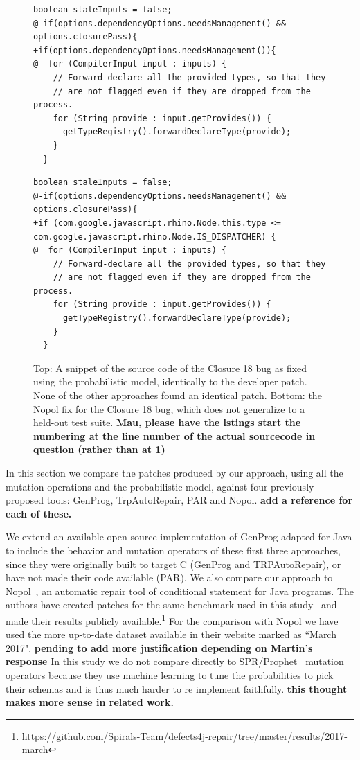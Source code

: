 \documentclass[conference]{IEEEtran}
\newcommand{\todo}[1]
  {{\scriptsize \textbf{\color{red} {#1}}}}
\begin{document}
\begin{figure}[t]
\begin{lstlisting}[frame=single]
boolean staleInputs = false;
@-if(options.dependencyOptions.needsManagement() && options.closurePass){
+if(options.dependencyOptions.needsManagement()){
@  for (CompilerInput input : inputs) {
    // Forward-declare all the provided types, so that they
    // are not flagged even if they are dropped from the process.
    for (String provide : input.getProvides()) {
      getTypeRegistry().forwardDeclareType(provide);
    }  
  }
	\end{lstlisting}


\begin{lstlisting}[frame=single]
boolean staleInputs = false;
@-if(options.dependencyOptions.needsManagement() && options.closurePass){
+if (com.google.javascript.rhino.Node.this.type <= com.google.javascript.rhino.Node.IS_DISPATCHER) {
@  for (CompilerInput input : inputs) {
    // Forward-declare all the provided types, so that they
    // are not flagged even if they are dropped from the process.
    for (String provide : input.getProvides()) {
      getTypeRegistry().forwardDeclareType(provide);
    }  
  }
	\end{lstlisting}

	\caption{Top: A snippet of the source code of the Closure 18 bug as fixed using the
      probabilistic model, identically to the developer patch. None of the other
      approaches found an identical patch.  Bottom: the Nopol fix for the
      Closure 18 bug, which does not generalize to a held-out test
      suite.\label{closure18prob}\todo{Mau, please have the lstings start the
        numbering at the line number of the actual sourcecode in question
        (rather than at 1)}}
\end{figure}

In this section we compare the patches produced by our approach, using all the
mutation operations and the probabilistic model, against
four previously-proposed tools:  GenProg, TrpAutoRepair, PAR and Nopol.\todo{add
  a reference for each of these.}

We extend an available open-source implementation of GenProg adapted for Java to
include the behavior and mutation operators of these first three approaches,
since they were originally built to target C (GenProg and TRPAutoRepair), or
have not made their code available (PAR). We also compare our approach to
Nopol~\cite{xuanNopol}, an automatic repair tool of conditional statement for
Java programs. The authors have created patches for the same benchmark used in
this study~\cite{martinez2016} and made their results publicly
available.\footnote{https://github.com/Spirals-Team/defects4j-repair/tree/master/results/2017-march}
For the comparison with Nopol we have used the more up-to-date dataset available
in their website marked as ``March 2017".\todo{pending to add more justification
  depending on Martin's response} 
In this study we do not compare directly to SPR/Prophet~\cite{long16proph}
mutation operators because they use machine learning to tune the probabilities
to pick their schemas and is thus much harder to re implement
faithfully. \todo{this thought makes more sense in related work.}
\end{document}
